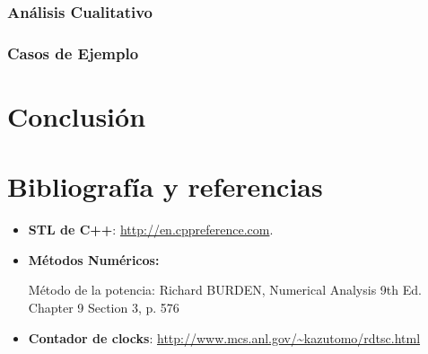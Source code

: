 \subsubsection{Análisis Cualitativo}

\subsubsection{Casos de Ejemplo}
	
	
\section{Conclusión}


\section{Bibliografía y referencias} %

\begin{itemize}
	\item \textbf{STL de C++}: \url{http://en.cppreference.com}.
	\item \textbf{Métodos Numéricos:}
		\par Método de la potencia: Richard BURDEN, Numerical Analysis 9th Ed. Chapter 9 Section 3, p. 576
	\item \textbf{Contador de clocks}: \url{http://www.mcs.anl.gov/\~kazutomo/rdtsc.html}
\end{itemize}



